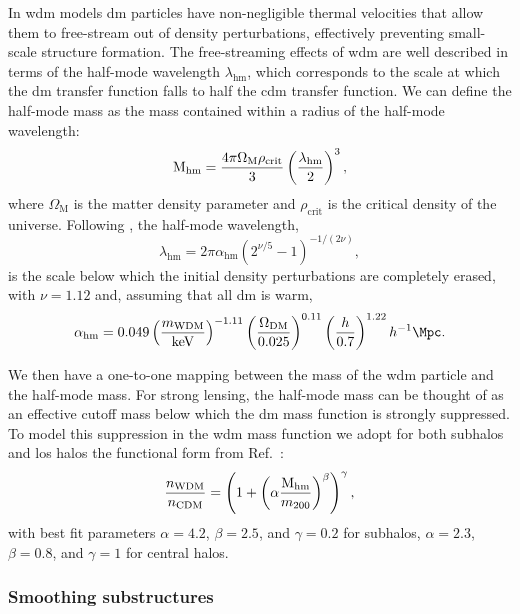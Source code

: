 In \gls*{wdm} models \gls*{dm} particles have non-negligible thermal velocities that allow them to free-stream out of density perturbations, effectively preventing small-scale structure formation. The free-streaming effects of \gls*{wdm} are well described in terms of the half-mode wavelength $\lambda_{\mathrm{hm}}$, which corresponds to the scale at which the \gls*{dm} transfer function falls to half the \gls*{cdm} transfer function. We can define the half-mode mass as the mass contained within a radius of the half-mode wavelength:
\begin{equation}
\mathrm{M_{hm}}=\frac{4\pi\Omega_{\mathrm{M}}\rho_{\mathrm{crit}}}{3}\left(\frac{\lambda_{\mathrm{hm}}}{2}\right)^3,
\end{equation}
where $\Omega_{\mathrm{M}}$ is the matter density parameter and $\rho_{\mathrm{crit}}$ is the critical density of the universe.
Following \cite{Schneider:2011yu}, the half-mode wavelength,
\begin{equation}
    \lambda_{\mathrm{hm}}=2\pi\alpha_{\mathrm{hm}}\left(2^{\nu/5}-1\right)^{-1/(2\nu)},
\end{equation}    
is the scale below which the initial density perturbations are completely erased, with $\nu= 1.12$ and, assuming that all \gls*{dm} is warm,
\begin{equation}
\alpha_{\mathrm{hm}}=0.049\left(\frac{m_\mathrm{WDM}}{\si{\keV}}\right)^{-1.11}\left(\frac{\Omega_\mathrm{DM}}{0.025}\right)^{0.11}\left(\frac{h}{0.7}\right)^{1.22}h^{-1}\si{\Mpc}.
\end{equation}

We then have a one-to-one mapping between the mass of the \gls*{wdm} particle and the half-mode mass.
For strong lensing, the half-mode mass can be thought of as an effective cutoff mass below which the \gls*{dm} mass function is strongly suppressed. To model this suppression in the \gls*{wdm} mass function we adopt for both subhalos and \gls*{los} halos the functional form from Ref.~\cite{Lovell:2020bcy}:
\begin{equation}\label{eq:cutoff}
    \frac{n_{\mathrm{WDM}}}{n_{\mathrm{CDM}}}=\left(1+\left(\alpha\frac{\mathrm{M_{hm}}}{m_{200}}\right)^\beta\right)^\gamma,
\end{equation}
with best fit parameters $\alpha=4.2$, $\beta=2.5$, and $\gamma=0.2$ for subhalos, $\alpha=2.3$, $\beta=0.8$, and $\gamma=1$ for central halos.

\subsubsection{Smoothing substructures}
\label{subsubsec:smoothing}

